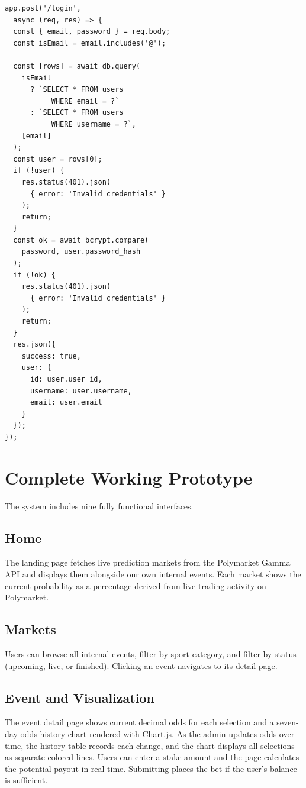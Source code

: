 \documentclass[sigconf,nonacm]{acmart}
\begin{document}
\begin{verbatim}
app.post('/login',
  async (req, res) => {
  const { email, password } = req.body;
  const isEmail = email.includes('@');

  const [rows] = await db.query(
    isEmail
      ? `SELECT * FROM users
           WHERE email = ?`
      : `SELECT * FROM users
           WHERE username = ?`,
    [email]
  );
  const user = rows[0];
  if (!user) {
    res.status(401).json(
      { error: 'Invalid credentials' }
    );
    return;
  }
  const ok = await bcrypt.compare(
    password, user.password_hash
  );
  if (!ok) {
    res.status(401).json(
      { error: 'Invalid credentials' }
    );
    return;
  }
  res.json({
    success: true,
    user: {
      id: user.user_id,
      username: user.username,
      email: user.email
    }
  });
});
\end{verbatim}

\section{Complete Working Prototype}

The system includes nine fully functional interfaces.

\subsection{Home}
The landing page fetches live prediction markets from the Polymarket
Gamma API and displays them alongside our own internal events. Each
market shows the current probability as a percentage derived from live
trading activity on Polymarket.

\subsection{Markets}
Users can browse all internal events, filter by sport category, and
filter by status (upcoming, live, or finished). Clicking an event
navigates to its detail page.

\subsection{Event and Visualization}
The event detail page shows current decimal odds for each selection and
a seven-day odds history chart rendered with Chart.js. As the admin
updates odds over time, the history table records each change, and the
chart displays all selections as separate colored lines. Users can enter
a stake amount and the page calculates the potential payout in real
time. Submitting places the bet if the user's balance is sufficient.
\end{document}
